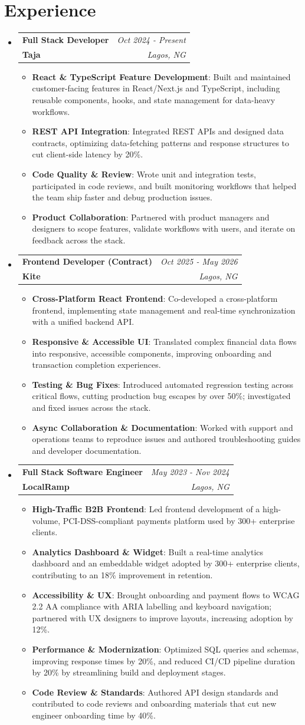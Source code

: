 \documentclass[a4paper]{article}
\makeatletter
\newcommand{\resumeItem}[2]{ \item\small{ \textbf{#1}: #2 } }
\newcommand{\resumeJobHeading}[4]{ %
\vspace{2pt}
\item[]
\begin{tabular*}{0.97\textwidth}{l@{\extracolsep{\fill}}r}
	\textbf{#1} & \textit{#3} \\
	\textbf{#4} & \textit{#2} \\
\end{tabular*}
\vspace{0pt}
}
\newcommand{\resumeSubHeadingListStart}{\begin{itemize}[leftmargin=*,topsep=1pt]}
\newcommand{\resumeSubHeadingListEnd}{\end{itemize}}
\newcommand{\resumeItemListStart}{\begin{itemize}[topsep=0pt,itemsep=0pt,parsep=0pt]}
\newcommand{\resumeItemListEnd}{\end{itemize}}
\makeatother
\begin{document}
	\vspace{4pt}
	\section{Experience}
	\resumeSubHeadingListStart
	\resumeJobHeading{Full Stack Developer}{Lagos, NG}{Oct 2024 - Present}{Taja}
	\resumeItemListStart
	\resumeItem{React \& TypeScript Feature Development}
	{Built and maintained customer-facing features in React/Next.js and TypeScript, including reusable components, hooks, and state management for data-heavy workflows.}
	\resumeItem{REST API Integration}
	{Integrated REST APIs and designed data contracts, optimizing data-fetching patterns and response structures to cut client-side latency by 20\%.}
	\resumeItem{Code Quality \& Review}
	{Wrote unit and integration tests, participated in code reviews, and built monitoring workflows that helped the team ship faster and debug production issues.}
	\resumeItem{Product Collaboration}
	{Partnered with product managers and designers to scope features, validate workflows with users, and iterate on feedback across the stack.}
	\resumeItemListEnd

	\resumeJobHeading{Frontend Developer (Contract)}{Lagos, NG}{Oct 2025 - May 2026}{Kite}
	\resumeItemListStart
	\resumeItem{Cross-Platform React Frontend}
	{Co-developed a cross-platform frontend, implementing state management and real-time synchronization with a unified backend API.}
	\resumeItem{Responsive \& Accessible UI}
	{Translated complex financial data flows into responsive, accessible components, improving onboarding and transaction completion experiences.}
	\resumeItem{Testing \& Bug Fixes}
	{Introduced automated regression testing across critical flows, cutting production bug escapes by over 50\%; investigated and fixed issues across the stack.}
	\resumeItem{Async Collaboration \& Documentation}
	{Worked with support and operations teams to reproduce issues and authored troubleshooting guides and developer documentation.}
	\resumeItemListEnd

	\resumeJobHeading{Full Stack Software Engineer}{Lagos, NG}{May 2023 - Nov 2024}{LocalRamp}
	\resumeItemListStart
	\resumeItem{High-Traffic B2B Frontend}
	{Led frontend development of a high-volume, PCI-DSS-compliant payments platform used by 300+ enterprise clients.}
	\resumeItem{Analytics Dashboard \& Widget}
	{Built a real-time analytics dashboard and an embeddable widget adopted by 300+ enterprise clients, contributing to an 18\% improvement in retention.}
	\resumeItem{Accessibility \& UX}
	{Brought onboarding and payment flows to WCAG 2.2 AA compliance with ARIA labelling and keyboard navigation; partnered with UX designers to improve layouts, increasing adoption by 12\%.}
	\resumeItem{Performance \& Modernization}
	{Optimized SQL queries and schemas, improving response times by 20\%, and reduced CI/CD pipeline duration by 20\% by streamlining build and deployment stages.}
	\resumeItem{Code Review \& Standards}
	{Authored API design standards and contributed to code reviews and onboarding materials that cut new engineer onboarding time by 40\%.}
	\resumeItemListEnd
	\resumeSubHeadingListEnd
\end{document}

